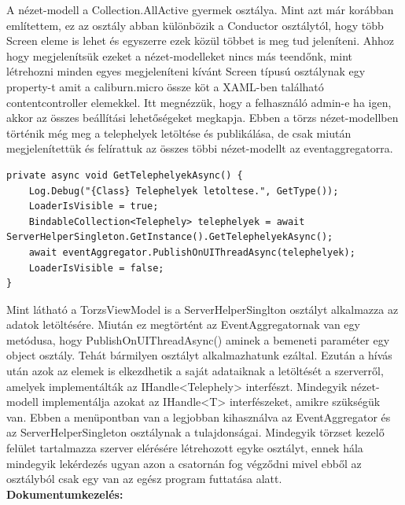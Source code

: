 \documentclass[
]{thesis-ekf}
\theoremstyle{definition}
\theoremstyle{remark}
\begin{document}
A nézet-modell a Collection.AllActive gyermek osztálya. Mint azt már korábban említettem, ez az osztály abban különbözik a Conductor osztálytól, hogy több Screen eleme is lehet és egyszerre ezek közül többet is meg tud jeleníteni. Ahhoz hogy megjelenítsük ezeket a nézet-modelleket nincs más teendőnk, mint létrehozni minden egyes megjeleníteni kívánt Screen típusú osztálynak egy property-t amit a caliburn.micro össze köt a XAML-ben található contentcontroller elemekkel. Itt megnézzük, hogy a felhasználó admin-e ha igen, akkor az összes beállítási lehetőségeket megkapja. Ebben a törzs nézet-modellben történik még meg a telephelyek letöltése és publikálása, de csak miután megjelenítettük és felírattuk az összes többi nézet-modellt az eventaggregatorra. 
\begin{lstlisting}
private async void GetTelephelyekAsync() {
	Log.Debug("{Class} Telephelyek letoltese.", GetType());
	LoaderIsVisible = true;
	BindableCollection<Telephely> telephelyek = await 	ServerHelperSingleton.GetInstance().GetTelephelyekAsync();
	await eventAggregator.PublishOnUIThreadAsync(telephelyek);
	LoaderIsVisible = false;
}
\end{lstlisting}

Mint látható a TorzsViewModel is a ServerHelperSinglton osztályt alkalmazza az adatok letöltésére. Miután ez megtörtént az EventAggregatornak van egy metódusa, hogy PublishOnUIThreadAsync() aminek a bemeneti paraméter egy object osztály. Tehát bármilyen osztályt alkalmazhatunk ezáltal. Ezután a hívás után azok az elemek is elkezdhetik a saját adataiknak a letöltését a szerverről, amelyek implementálták az IHandle<Telephely> interfészt. Mindegyik nézet-modell implementálja azokat az IHandle<T> interfészeket, amikre szükségük van. Ebben a menüpontban van a legjobban kihasználva az EventAggregator és az ServerHelperSingleton osztálynak a tulajdonságai.  Mindegyik törzset kezelő felület tartalmazza szerver elérésére létrehozott egyke osztályt, ennek hála mindegyik lekérdezés ugyan azon a csatornán fog végződni mivel ebből az osztályból csak egy van az egész program futtatása alatt. \\
\textbf{Dokumentumkezelés:}
\end{document}
